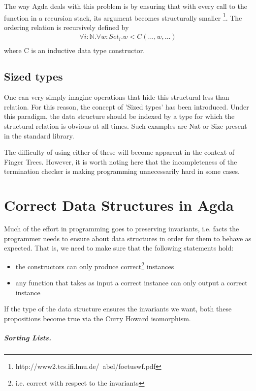 \documentclass[12pt,twoside,notitlepage]{report}
\begin{document}
The way Agda deals with this problem is by ensuring that with every call to the function in a recursion stack, its argument becomes structurally smaller \cite{str_smaller} \footnote{http://www2.tcs.ifi.lmu.de/~abel/foetuswf.pdf}. The ordering relation is recursively defined by \begin{align*}
\forall i : \mathbb{N}.\forall w : Set_i. w < C(...,w,...)\\
\end{align*}
where C is an inductive data type constructor.

\subsection{Sized types}

One can very simply imagine operations that hide this structural less-than relation. For this reason, the concept of 'Sized types' has been introduced. Under this paradigm, the data structure should be indexed by a type for which the structural relation is obvious at all times. Such examples are Nat or Size present in the standard library. 

The difficulty of using either of these will become apparent in the context of Finger Trees. However, it is worth noting here that the incompleteness \cite{adam_chipala}  of the termination checker is making programming unnecessarily hard in some cases. 

\section{Correct Data Structures in Agda}

Much of the effort in programming goes to preserving invariants, i.e. facts the programmer needs to ensure about data structures in order for them to behave as expected. 
That is, we need to make sure that the following statements hold:
\begin{itemize}
\item the constructors can only produce correct\footnote{i.e. correct with respect to the invariants} instances
\item any function that takes as input a correct instance can only output a correct instance
\end{itemize}

If the type of the data structure ensures the invariants we want, both these propositions become true via the Curry Howard isomorphism.

\subparagraph{Sorting Lists.}
\end{document}
